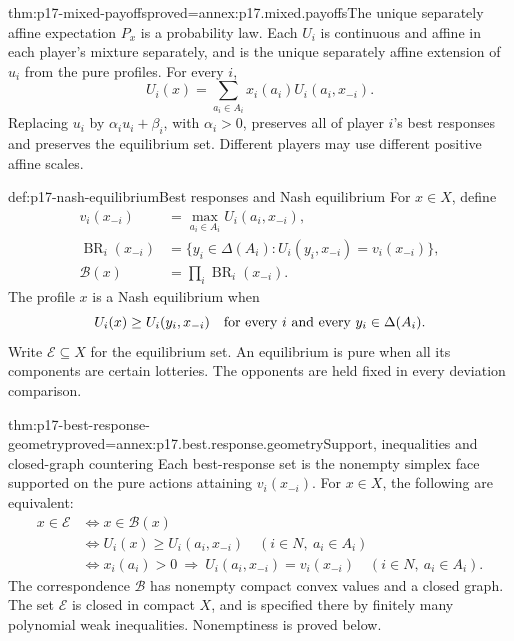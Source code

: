 \begin{hblemma}{thm:p17-mixed-payoffs}{proved=annex:p17.mixed.payoffs}{The unique separately affine expectation}
\(P_x\) is a probability law. Each \(U_i\) is continuous and affine
in each player's mixture separately, and is the unique separately
affine extension of \(u_i\) from the pure profiles. For every \(i\),
\[
           U_i(x)=\sum_{a_i\in A_i}x_i(a_i)U_i(a_i,x_{-i}).
\]
Replacing \(u_i\) by \(\alpha_i u_i+\beta_i\), with
\(\alpha_i>0\), preserves all of player \(i\)'s best responses
and preserves the equilibrium set. Different players may use
different positive affine scales.
\end{hblemma}

\begin{hbdefinition}{def:p17-nash-equilibrium}{Best responses and Nash equilibrium}
For \(x\in X\), define
\[
\begin{aligned}
 v_i(x_{-i})&=\max_{a_i\in A_i}U_i(a_i,x_{-i}),\\
 \operatorname{BR}_i(x_{-i})
    &=\{y_i\in\Delta(A_i):U_i(y_i,x_{-i})=v_i(x_{-i})\},\\
 \mathcal B(x)&=\prod_i\operatorname{BR}_i(x_{-i}).
\end{aligned}
\]
The profile \(x\) is a Nash equilibrium when
\[
                 U_i(x)\geq U_i(y_i,x_{-i})
              \quad\hbox{for every }i\hbox{ and every }y_i\in\Delta(A_i).
\]
Write \(\mathcal E\subseteq X\) for the equilibrium set.
An equilibrium is pure when all its components are certain lotteries.
The opponents are held fixed in every deviation comparison.
\end{hbdefinition}

\begin{hblemma}{thm:p17-best-response-geometry}{proved=annex:p17.best.response.geometry}{Support, inequalities and closed-graph countering}
Each best-response set is the nonempty simplex face supported on
the pure actions attaining \(v_i(x_{-i})\).
For \(x\in X\), the following are equivalent:
\[
\begin{aligned}
 x\in\mathcal E
 &\Longleftrightarrow x\in\mathcal B(x)\\
 &\Longleftrightarrow
 U_i(x)\geq U_i(a_i,x_{-i})\quad(i\in N,\ a_i\in A_i)\\
 &\Longleftrightarrow
 x_i(a_i)>0\ \Longrightarrow\
                  U_i(a_i,x_{-i})=v_i(x_{-i})
                      \quad(i\in N,\ a_i\in A_i).
\end{aligned}
\]
The correspondence \(\mathcal B\) has nonempty compact convex
values and a closed graph. The set \(\mathcal E\) is closed
in compact \(X\), and is specified there by finitely many
polynomial weak inequalities. Nonemptiness is proved below.
\end{hblemma}

